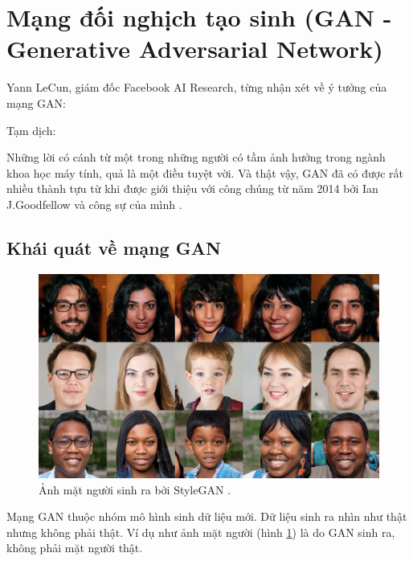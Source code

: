 \documentclass[a4paper, 12pt]{report}
\begin{document}
\section{Mạng đối nghịch tạo sinh (GAN - Generative Adversarial Network)}\label{ganarchitecture}

Yann LeCun, giám đốc Facebook AI Research, từng nhận xét về ý tưởng của mạng GAN:


Tạm dịch:

\vspace{5pt}

Những lời có cánh từ một trong những người có tầm ảnh hưởng trong ngành khoa học máy tính, quả là một điều tuyệt vời.
Và thật vậy, GAN đã có được rất nhiều thành tựu từ khi được giới thiệu với công chúng từ năm 2014 bởi Ian J.Goodfellow và công sự của mình \cite{goodfellow2014generative}.

\subsection{Khái quát về mạng GAN}\label{gannetwork}

\begin{figure}[!h]
\captionsetup{width=0.8\textwidth}
\centering
\includegraphics[width=15cm]{images/2_6.PNG}
\caption{Ảnh mặt người sinh ra bởi StyleGAN \cite{karras2019stylebased}.}
\label{fig:facesstylegan}
\end{figure}

Mạng GAN thuộc nhóm mô hình sinh dữ liệu mới.
Dữ liệu sinh ra nhìn như thật nhưng không phải thật.
Ví dụ như ảnh mặt người (hình \ref{fig:facesstylegan}) là do GAN sinh ra, không phải mặt người thật.\vspace{5pt}
\end{document}
